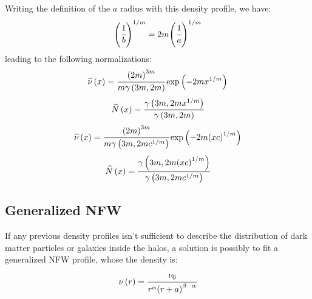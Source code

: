 Writing the definition of the $a$ radius with this density profile, we have:
%
\begin{equation}
    {\left(\cfrac{1}{b}\right)}^{1/m} = 2m{\left(\cfrac{1}{a}\right)}^{1/m}
\end{equation}
%
leading to the following normalizations:
%
\begin{equation}
    \widetilde\nu \left(x\right) = \cfrac{{\left(2m\right)}^{3m}}{m\gamma
    \left(3m, 2m\right)} \exp \left(-2mx^{1/m}\right)
\end{equation}
%
\begin{equation}
    \widetilde{N} \left(x\right) = \cfrac{\gamma \left(3m, 2m
    x^{1/m}\right)}{\gamma \left(3m, 2m\right)}
\end{equation}
%
\begin{equation}
    \widehat\nu \left(x\right) = \cfrac{{\left(2m\right)}^{3m}}{m\gamma
    \left(3m, 2m c^{1/m}\right)} \exp \left(-2m{\left(xc\right)}^{1/m}\right)
\end{equation}
%
\begin{equation}
    \widehat{N} \left(x\right) = \cfrac{\gamma \left(3m, 2m
        {\left(xc\right)}^{1/m}\right)}{\gamma \left(3m, 2m c^{1/m}\right)}
\end{equation}

\subsection{Generalized NFW}
\label{sub:generalized_nfw}

If any previous density profiles isn't sufficient to describe the distribution
of dark matter particles or galaxies inside the halos, a solution is possibly
to fit a generalized NFW profile, whose the density is:
%
\begin{equation}
    \nu \left(r\right) =
    \cfrac{\nu_0}{r^\alpha{\left(r+a\right)}^{\beta-\alpha}}
\end{equation}

